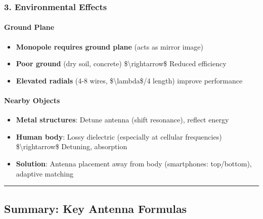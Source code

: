 \subsubsection{3. Environmental Effects}\label{environmental-effects}

\paragraph{Ground Plane}\label{ground-plane}

\begin{itemize}
\tightlist
\item
  \textbf{Monopole requires ground plane} (acts as mirror image)
\item
  \textbf{Poor ground} (dry soil, concrete)
  \$\textbackslash rightarrow\$ Reduced efficiency
\item
  \textbf{Elevated radials} (4-8 wires, \$\textbackslash lambda\$/4
  length) improve performance
\end{itemize}

\paragraph{Nearby Objects}\label{nearby-objects}

\begin{itemize}
\tightlist
\item
  \textbf{Metal structures}: Detune antenna (shift resonance), reflect
  energy
\item
  \textbf{Human body}: Lossy dielectric (especially at cellular
  frequencies) \$\textbackslash rightarrow\$ Detuning, absorption
\item
  \textbf{Solution}: Antenna placement away from body (smartphones:
  top/bottom), adaptive matching
\end{itemize}

\begin{center}\rule{0.5\linewidth}{0.5pt}\end{center}

\subsection{Summary: Key Antenna
Formulas}\label{summary-key-antenna-formulas}

